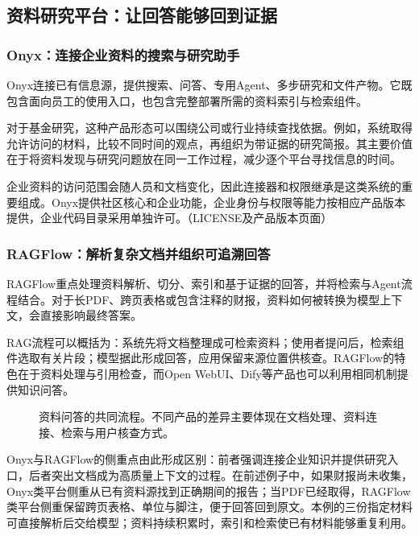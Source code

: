 \subsection{资料研究平台：让回答能够回到证据}
\subsubsection{Onyx：连接企业资料的搜索与研究助手}
Onyx连接已有信息源，提供搜索、问答、专用Agent、多步研究和文件产物。它既包含面向员工的使用入口，也包含完整部署所需的资料索引与检索组件。

对于基金研究，这种产品形态可以围绕公司或行业持续查找依据。例如，系统取得允许访问的材料，比较不同时间的观点，再组织为带证据的研究简报。其主要价值在于将资料发现与研究问题放在同一工作过程，减少逐个平台寻找信息的时间。

企业资料的访问范围会随人员和文档变化，因此连接器和权限继承是这类系统的重要组成。Onyx提供社区核心和企业功能，企业身份与权限等能力按相应产品版本提供，企业代码目录采用单独许可。（LICENSE及产品版本页面）

\subsubsection{RAGFlow：解析复杂文档并组织可追溯回答}
RAGFlow重点处理资料解析、切分、索引和基于证据的回答，并将检索与Agent流程结合。对于长PDF、跨页表格或包含注释的财报，资料如何被转换为模型上下文，会直接影响最终答案。

RAG流程可以概括为：系统先将文档整理成可检索资料；使用者提问后，检索组件选取有关片段；模型据此形成回答，应用保留来源位置供核查。RAGFlow的特色在于资料处理与引用检查，而Open WebUI、Dify等产品也可以利用相同机制提供知识问答。

\begin{figure}[H]\centering
{}
\caption{资料问答的共同流程。不同产品的差异主要体现在文档处理、资料连接、检索与用户核查方式。}
\end{figure}

Onyx与RAGFlow的侧重点由此形成区别：前者强调连接企业知识并提供研究入口，后者突出文档成为高质量上下文的过程。在前述例子中，如果财报尚未收集，Onyx类平台侧重从已有资料源找到正确期间的报告；当PDF已经取得，RAGFlow类平台侧重保留跨页表格、单位与脚注，便于回答回到原文。本例的三份指定材料可直接解析后交给模型；资料持续积累时，索引和检索使已有材料能够重复利用。

